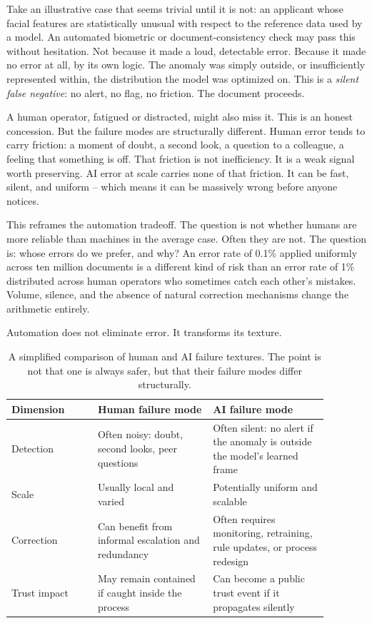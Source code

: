 \documentclass[11pt,a4paper]{article}
\begin{document}
Take an illustrative case that seems trivial until it is not: an applicant whose facial features are statistically unusual with respect to the reference data used by a model. An automated biometric or document-consistency check may pass this without hesitation. Not because it made a loud, detectable error. Because it made no error at all, by its own logic. The anomaly was simply outside, or insufficiently represented within, the distribution the model was optimized on. This is a \emph{silent false negative}: no alert, no flag, no friction. The document proceeds.

A human operator, fatigued or distracted, might also miss it. This is an honest concession. But the failure modes are structurally different. Human error tends to carry friction: a moment of doubt, a second look, a question to a colleague, a feeling that something is off. That friction is not inefficiency. It is a weak signal worth preserving. AI error at scale carries none of that friction. It can be fast, silent, and uniform -- which means it can be massively wrong before anyone notices.

This reframes the automation tradeoff. The question is not whether humans are more reliable than machines in the average case. Often they are not. The question is: whose errors do we prefer, and why? An error rate of 0.1\% applied uniformly across ten million documents is a different kind of risk than an error rate of 1\% distributed across human operators who sometimes catch each other's mistakes. Volume, silence, and the absence of natural correction mechanisms change the arithmetic entirely.

Automation does not eliminate error. It transforms its texture.

\begin{table}[h!]
\centering
\small
\begin{tabular}{p{0.24\linewidth}p{0.32\linewidth}p{0.32\linewidth}}
\toprule
\textbf{Dimension} & \textbf{Human failure mode} & \textbf{AI failure mode} \\
\midrule
Detection & Often noisy: doubt, second looks, peer questions & Often silent: no alert if the anomaly is outside the model's learned frame \\
Scale & Usually local and varied & Potentially uniform and scalable \\
Correction & Can benefit from informal escalation and redundancy & Often requires monitoring, retraining, rule updates, or process redesign \\
Trust impact & May remain contained if caught inside the process & Can become a public trust event if it propagates silently \\
\bottomrule
\end{tabular}
\caption{A simplified comparison of human and AI failure textures. The point is not that one is always safer, but that their failure modes differ structurally.}
\end{table}
\end{document}
